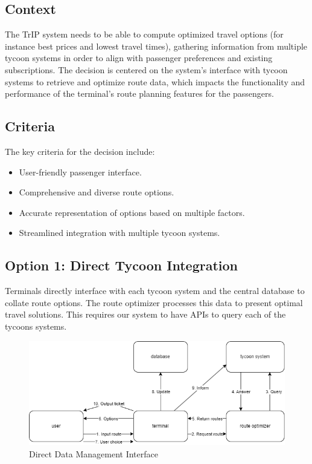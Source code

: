 \subsection*{Context}
The TrIP system needs to be able to compute optimized travel options (for instance best prices and lowest travel times), gathering information from multiple tycoon systems in order to align with passenger preferences and existing subscriptions.
The decision is centered on the system's interface with tycoon systems to retrieve and optimize route data, which impacts the functionality and performance of the terminal's route planning features for the passengers.

\subsection*{Criteria}
The key criteria for the decision include:
\begin{itemize}
    \item User-friendly passenger interface.
    \item Comprehensive and diverse route options.
    \item Accurate representation of options based on multiple factors.
    \item Streamlined integration with multiple tycoon systems.
\end{itemize}

\subsection*{Option 1: Direct Tycoon Integration}
Terminals directly interface with each tycoon system and the central database to collate route options. The route optimizer processes this data to present optimal travel solutions. This requires our system to have APIs to query each of the tycoons systems.
\begin{figure}[ht]
    \centering
    \includegraphics[width=\textwidth]{drawings/decision3_drawings/direct.png}
    \caption{Direct Data Management Interface}
    \label{fig:direct-data-interface}
\end{figure}

